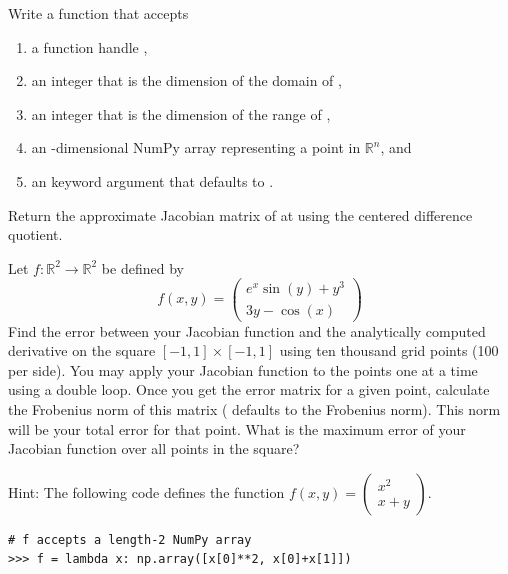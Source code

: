 \begin{problem}
\leavevmode
Write a function that accepts 
\begin{enumerate}
\item a function handle ,
\item an integer  that is the dimension of the domain of ,
\item an integer  that is the dimension of the range of ,
\item an -dimensional NumPy array  representing a point in $\mathbb{R}^n$, and
\item an keyword argument  that defaults to .
\end{enumerate}
Return the approximate Jacobian matrix of  at  using the centered difference quotient.
\end{problem}
\begin{problem}
\item Let $f: \mathbb{R}^2 \to \mathbb{R}^2$ be defined by
\begin{equation*}
f(x, y) =
\begin{pmatrix}
e^{x} \sin(y) + y^3 \\
3y - \cos(x)
\end{pmatrix}
\end{equation*}
Find the error between your Jacobian function and the analytically computed derivative on the square $[-1,1] \times [-1,1]$ using ten thousand grid points (100 per side).
You may apply your Jacobian function to the points one at a time using a double  loop.  Once you get the error matrix for a given point, calculate the Frobenius norm of this matrix ( defaults to the Frobenius norm).  This norm will be your total error for that point.
What is the maximum error of your Jacobian function over all points in the square?

Hint: The following code defines the function
$f(x,y) = 
\begin{pmatrix}
x^2\\
x+y
\end{pmatrix}$.
\begin{lstlisting}
# f accepts a length-2 NumPy array
>>> f = lambda x: np.array([x[0]**2, x[0]+x[1]])
\end{lstlisting}
\end{problem}

